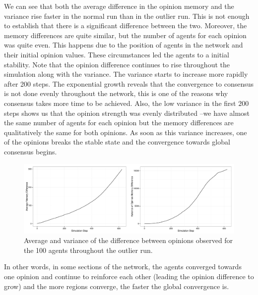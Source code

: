\documentclass[preprint,number]{elsarticle}
\begin{document}
We can see that both the average difference in the opinion memory and the variance rise faster in the normal run than in the outlier run. This is not enough to establish that there is a significant difference between the two. Moreover, the memory differences are quite similar, but the number of agents for each opinion was quite even. This happens due to the position of agents in the network and their initial opinion values. These circumstances led the agents to a initial stability. Note that the opinion difference continues to rise throughout the simulation along with the variance. The variance starts to increase more rapidly after 200 steps. The exponential growth reveals that the convergence to consensus is not done evenly throughout the network, this is one of the reasons why consensus takes more time to be achieved. Also, the low variance in the first $200$ steps shows us that the opinion strength was evenly distributed --we have almost the same number of agents for each opinion but the memory differences are qualitatively the same for both opinions. As soon as this variance increases, one of the opinions breaks the stable state and the convergence towards global consensus begins. 

\begin{figure}[H]
	\centering
	\includegraphics[width=1\linewidth]{"../analysis/pdf/cp-regular-outlier-fullrun-memory-diff"}
	\begin{minipage}{0.9\textwidth}
		\caption{Average and variance of the difference between opinions observed for the 100 agents throughout the outlier run.}
		\label{fig:ctx_perm_kreg_run_outlier_diff_full}
	\end{minipage}
\end{figure}

\noindent In other words, in some sections of the network, the agents converged towards one opinion and continue to reinforce each other (leading the opinion difference to grow) and the more regions converge, the faster the global convergence is.  
\end{document}
